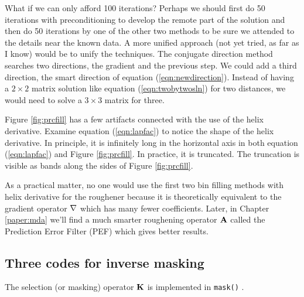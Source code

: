 \par
What if we can only afford 100 iterations?
Perhaps we should first do 50 iterations with
preconditioning to develop the remote part of the solution and
then do 50 iterations by one of the other two methods to be sure
we attended to the details near the known data.
A more unified approach (not yet tried, as far as I know)
would be to unify the techniques.
The conjugate direction method searches two directions,
the gradient and the previous step.
We could add a third direction,
the smart direction of equation (\ref{eqn:newdirection}).
Instead of having a $2\times 2$ matrix
solution like equation (\ref{eqn:twobytwosln}) for two distances,
we would need to solve a $3\times 3$ matrix for three.

\par
Figure \ref{fig:prcfill} has a few artifacts connected with the
use of the helix derivative.
Examine equation (\ref{eqn:lapfac}) to notice the shape of the helix derivative.
In principle, it is infinitely long in the horizontal axis
in both equation (\ref{eqn:lapfac}) and Figure \ref{fig:prcfill}.
In practice, it is truncated.  The truncation is visible as bands
along the sides of Figure \ref{fig:prcfill}.

\par
As a practical matter, no one would use the first two bin filling methods
with helix derivative for the roughener
because it is theoretically equivalent to the gradient operator
$\bold \nabla$ which has many fewer coefficients.
Later, in Chapter
\ref{paper:mda}
we'll find a much smarter roughening operator $\bold A$
called the Prediction Error Filter (PEF)
which gives better results.







\subsection{Three codes for inverse masking}
The selection (or masking) operator $\bold K$ is
implemented in
\texttt{mask()} .

